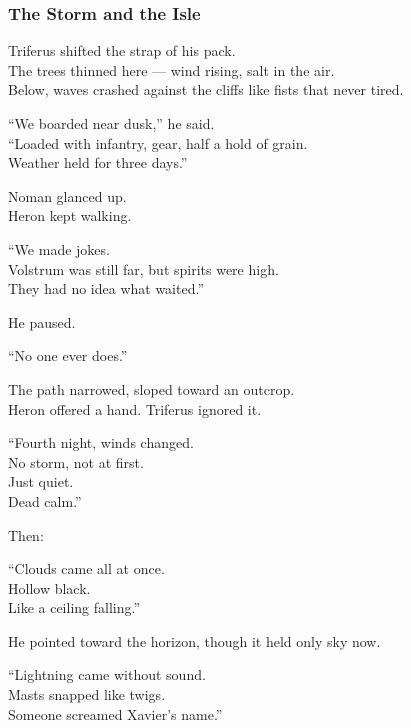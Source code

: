 \documentclass[12pt]{article}
\begin{document}
\dotfill

\subsubsection*{The Storm and the Isle}

Triferus shifted the strap of his pack.\\
The trees thinned here — wind rising, salt in the air.\\
Below, waves crashed against the cliffs like fists that never tired.

“We boarded near dusk,” he said.\\
“Loaded with infantry, gear, half a hold of grain.\\
Weather held for three days.”

\vspace{1em}

Noman glanced up.\\
Heron kept walking.

“We made jokes.\\
Volstrum was still far, but spirits were high.\\
They had no idea what waited.”

He paused.

“No one ever does.”

\vspace{1em}

The path narrowed, sloped toward an outcrop.\\
Heron offered a hand. Triferus ignored it.

“Fourth night, winds changed.\\
No storm, not at first.\\
Just quiet.\\
Dead calm.”

\vspace{1em}

Then:

“Clouds came all at once.\\
Hollow black.\\
Like a ceiling falling.”

He pointed toward the horizon, though it held only sky now.

“Lightning came without sound.\\
Masts snapped like twigs.\\
Someone screamed Xavier’s name.”

\vspace{1em}
\end{document}
